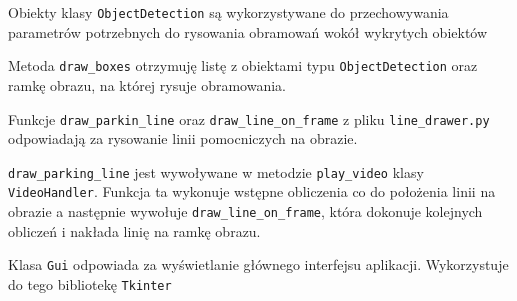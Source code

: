 
Obiekty klasy \verb|ObjectDetection| są wykorzystywane do przechowywania parametrów potrzebnych do rysowania obramowań wokół wykrytych obiektów


Metoda \verb|draw_boxes| otrzymuję listę z obiektami typu \verb|ObjectDetection| oraz ramkę obrazu, na której rysuje obramowania.


Funkcje \verb|draw_parkin_line| oraz \verb|draw_line_on_frame| z pliku \verb|line_drawer.py| odpowiadają za rysowanie linii pomocniczych na obrazie.

\verb|draw_parking_line| jest wywoływane w metodzie \verb|play_video| klasy \verb|VideoHandler|.
Funkcja ta wykonuje wstępne obliczenia co do położenia linii na obrazie a następnie wywołuje \verb|draw_line_on_frame|, która dokonuje kolejnych obliczeń i nakłada linię na ramkę obrazu.



Klasa \verb|Gui| odpowiada za wyświetlanie głównego interfejsu aplikacji. Wykorzystuje do tego bibliotekę \verb|Tkinter|




